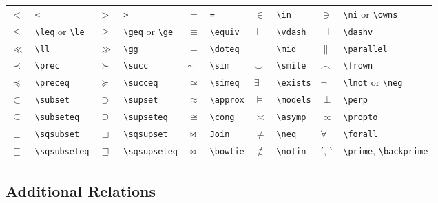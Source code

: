 \documentclass[10pt, english]{article}
\begin{document}
	\begin{center}
		\scriptsize
	\begin{tabular}{ll|ll|ll|ll|ll}
		$<$ & \verb|<| & $>$ & \verb|>| & $=$ & \verb|=| & $\in$ & \verb|\in| & $\ni$ & \verb|\ni| or \verb|\owns| \\
		$\le$ & \verb|\leq| or \verb|\le| & $\ge$ & \verb|\geq| or \verb|\ge| & $\equiv$ & \verb|\equiv| & $\vdash$ & \verb|\vdash| & $\dashv$ & \verb|\dashv| \\
		$\ll$ & \verb|\ll| & $\gg$ & \verb|\gg| & $\doteq$ & \verb|\doteq| & $\mid$ & \verb|\mid| & $\parallel$ & \verb|\parallel| \\
		$\prec$ & \verb|\prec| & $\succ$ & \verb|\succ| & $\sim$ & \verb|\sim| & $\smile$ & \verb|\smile| & $\frown$ & \verb|\frown| \\
		$\preceq$ & \verb|\preceq| & $\succeq$ & \verb|\succeq| & $\simeq$ & \verb|\simeq| & $\exists$ & \verb|\exists| & $\lnot$ & \verb|\lnot| or \verb|\neg| \\
		$\subset$ & \verb|\subset| & $\supset$ & \verb|\supset| & $\approx$ & \verb|\approx| & $\models$ & \verb|\models| & $\perp$ & \verb|\perp| \\
		$\subseteq$ & \verb|\subseteq| & $\supseteq$ & \verb|\supseteq| & $\cong$ & \verb|\cong| & $\asymp$ & \verb|\asymp| & $\propto$ & \verb|\propto| \\
		$\sqsubset$ & \verb|\sqsubset| & $\sqsupset$ & \verb|\sqsupset| & $\Join$ & \verb|Join| & $\neq$ & \verb|\neq| & $\forall$ & \verb|\forall| \\
		$\sqsubseteq$ & \verb|\sqsubseteq| & $\sqsupseteq$ & \verb|\sqsupseteq| & $\bowtie$ & \verb|\bowtie| & $\notin$ & \verb|\notin| & $\prime$, $\backprime$ & \verb|\prime|, \verb|\backprime| \\
	\end{tabular}
	\end{center}

	\subsection{Additional Relations}
\end{document}
